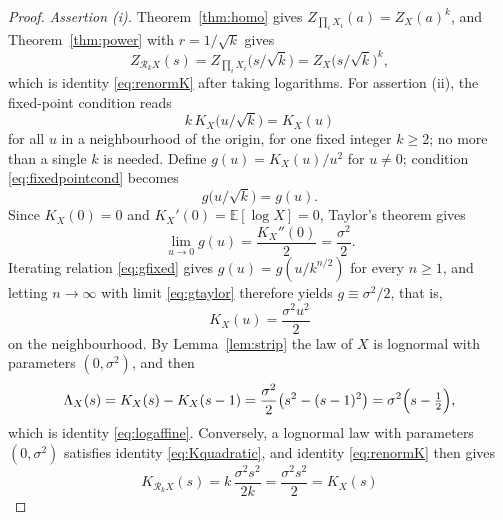 \documentclass[sn-mathphys-num]{sn-jnl}
\theoremstyle{thmstyleone}%
\theoremstyle{thmstyletwo}%
\theoremstyle{thmstylethree}%
\theoremstyle{thmstyleone}%
\providecommand{\E}{\mathbb{E}}
\begin{document}
\begin{appendices}
		\thmrenorm*
		
		\begin{proof}
			\emph{Assertion (i).} Theorem~\ref{thm:homo} gives
			$Z_{\prod_iX_i}(a)=Z_X(a)^k$, and Theorem~\ref{thm:power} with
			$r=1/\sqrt k$ gives
			\begin{equation}\label{eq:renormproof}
				Z_{\mathcal R_kX}(s)=Z_{\prod_iX_i}\bigl(s/\sqrt k\bigr)
				=Z_X\bigl(s/\sqrt k\bigr)^{k},
			\end{equation}
			which is identity \eqref{eq:renormK} after taking logarithms. For
			assertion (ii), the fixed-point condition reads
			\begin{equation}\label{eq:fixedpointcond}
				k\,K_X\bigl(u/\sqrt k\bigr)=K_X(u)
			\end{equation}
			for all $u$ in a neighbourhood of the origin, for one fixed
			integer $k\ge2$; no more than a single $k$ is needed.
			Define $g(u)=K_X(u)/u^{2}$ for $u\neq0$; condition
			\eqref{eq:fixedpointcond} becomes
			\begin{equation}\label{eq:gfixed}
				g\bigl(u/\sqrt k\bigr)=g(u) .
			\end{equation}
			Since $K_X(0)=0$ and $K_X'(0)=\E[\log X]=0$, Taylor's theorem gives
			\begin{equation}\label{eq:gtaylor}
				\lim_{u\to0}g(u)=\frac{K_X''(0)}{2}=\frac{\sigma^2}{2} .
			\end{equation}
			Iterating relation \eqref{eq:gfixed} gives $g(u)=g(u/k^{n/2})$
			for every $n\ge1$, and letting $n\to\infty$ with limit
			\eqref{eq:gtaylor} therefore yields $g\equiv\sigma^2/2$, that
			is,
			\begin{equation}\label{eq:Kquadratic}
				K_X(u)=\frac{\sigma^2u^2}{2}
			\end{equation}
			on the neighbourhood. By Lemma~\ref{lem:strip} the law of $X$ is
			lognormal with parameters $(0,\sigma^2)$, and then
			\begin{equation}\label{eq:logaffineproof}
				\Lambda_X(s)=K_X(s)-K_X(s-1)
				=\frac{\sigma^2}{2}\bigl(s^2-(s-1)^2\bigr)
				=\sigma^2\Bigl(s-\tfrac12\Bigr),
			\end{equation}
			which is identity \eqref{eq:logaffine}. Conversely, a lognormal law
			with parameters $(0,\sigma^2)$ satisfies identity
			\eqref{eq:Kquadratic}, and identity \eqref{eq:renormK} then gives
			\begin{equation}\label{eq:lnfixed}
				K_{\mathcal R_kX}(s)=k\,\frac{\sigma^2s^2}{2k}
				=\frac{\sigma^2s^2}{2}=K_X(s)
			\end{equation}

\end{proof}
\end{appendices}
\end{document}
